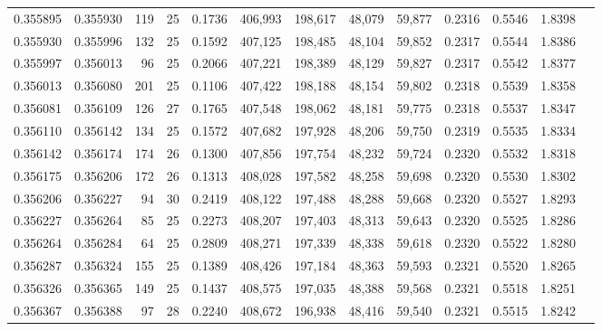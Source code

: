 \begin{tabular}{rrrrrrrrrrrrr}
0.355895 & 0.355930 &   119 &  25 &                                     0.1736 & 406,993 & 198,617 &  48,079 &  59,877 & 0.2316 & 0.5546 & 1.8398 \\
0.355930 & 0.355996 &   132 &  25 &                                     0.1592 & 407,125 & 198,485 &  48,104 &  59,852 & 0.2317 & 0.5544 & 1.8386 \\
0.355997 & 0.356013 &    96 &  25 &                                     0.2066 & 407,221 & 198,389 &  48,129 &  59,827 & 0.2317 & 0.5542 & 1.8377 \\
0.356013 & 0.356080 &   201 &  25 &                                     0.1106 & 407,422 & 198,188 &  48,154 &  59,802 & 0.2318 & 0.5539 & 1.8358 \\
0.356081 & 0.356109 &   126 &  27 &                                     0.1765 & 407,548 & 198,062 &  48,181 &  59,775 & 0.2318 & 0.5537 & 1.8347 \\
0.356110 & 0.356142 &   134 &  25 &                                     0.1572 & 407,682 & 197,928 &  48,206 &  59,750 & 0.2319 & 0.5535 & 1.8334 \\
0.356142 & 0.356174 &   174 &  26 &                                     0.1300 & 407,856 & 197,754 &  48,232 &  59,724 & 0.2320 & 0.5532 & 1.8318 \\
0.356175 & 0.356206 &   172 &  26 &                                     0.1313 & 408,028 & 197,582 &  48,258 &  59,698 & 0.2320 & 0.5530 & 1.8302 \\
0.356206 & 0.356227 &    94 &  30 &                                     0.2419 & 408,122 & 197,488 &  48,288 &  59,668 & 0.2320 & 0.5527 & 1.8293 \\
0.356227 & 0.356264 &    85 &  25 &                                     0.2273 & 408,207 & 197,403 &  48,313 &  59,643 & 0.2320 & 0.5525 & 1.8286 \\
0.356264 & 0.356284 &    64 &  25 &                                     0.2809 & 408,271 & 197,339 &  48,338 &  59,618 & 0.2320 & 0.5522 & 1.8280 \\
0.356287 & 0.356324 &   155 &  25 &                                     0.1389 & 408,426 & 197,184 &  48,363 &  59,593 & 0.2321 & 0.5520 & 1.8265 \\
0.356326 & 0.356365 &   149 &  25 &                                     0.1437 & 408,575 & 197,035 &  48,388 &  59,568 & 0.2321 & 0.5518 & 1.8251 \\
0.356367 & 0.356388 &    97 &  28 &                                     0.2240 & 408,672 & 196,938 &  48,416 &  59,540 & 0.2321 & 0.5515 & 1.8242 \\

\end{tabular}
